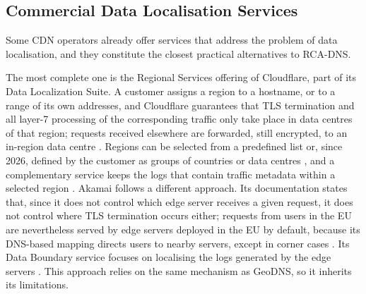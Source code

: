 \subsection{Commercial Data Localisation Services}
\label{sc:rcadns_related_commercial}

Some CDN operators already offer services that address the problem of data localisation, and they constitute the closest practical alternatives to RCA-DNS.

The most complete one is the Regional Services offering of Cloudflare, part of its Data Localization Suite. A customer assigns a region to a hostname, or to a range of its own addresses, and Cloudflare guarantees that TLS termination and all layer-7 processing of the corresponding traffic only take place in data centres of that region; requests received elsewhere are forwarded, still encrypted, to an in-region data centre \cite{RegionalDocs, RegionalizedDocs}. Regions can be selected from a predefined list or, since 2026, defined by the customer as groups of countries or data centres \cite{IntroducingBlog}, and a complementary service keeps the logs that contain traffic metadata within a selected region \cite{CustomerDocs}. Akamai follows a different approach. Its documentation states that, since it does not control which edge server receives a given request, it does not control where TLS termination occurs either; requests from users in the EU are nevertheless served by edge servers deployed in the EU by default, because its DNS-based mapping directs users to nearby servers, except in corner cases \cite{DataAkamai}. Its Data Boundary service focuses on localising the logs generated by the edge servers \cite{CommitmentAkamai}. This approach relies on the same mechanism as GeoDNS, so it inherits its limitations.

